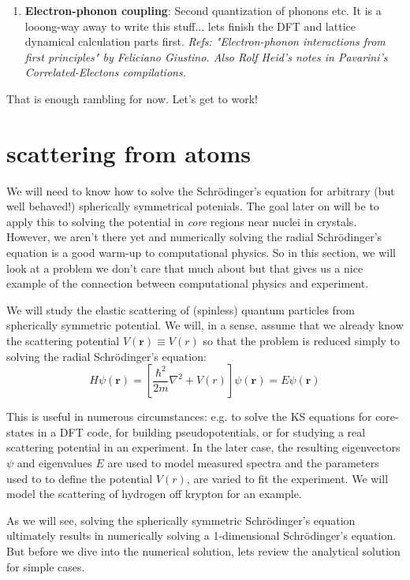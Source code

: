 \documentclass[prb,aps,11pt,superscriptaddress,floatfix]{revtex4-2}
\begin{document}
\begin{enumerate}
  \item \textbf{Electron-phonon coupling}: Second quantization of phonons etc. It is a looong-way away to write this stuff... lets finish the DFT and lattice dynamical calculation parts first. \emph{Refs: "Electron-phonon interactions from first principles" by Feliciano Giustino. Also Rolf Heid's notes in Pavarini's Correlated-Electons compilations.}
\end{enumerate}

That is enough rambling for now. Let's get to work!







\section{scattering from atoms}

We will need to know how to solve the Schr\"odinger's equation for arbitrary (but well behaved!) spherically symmetrical potenials. The goal later on will be to apply this to solving the potential in \emph{core} regions near nuclei in crystals. However, we aren't there yet and numerically solving the radial Schr\"odinger's equation is a good warm-up to computational physics. So in this section, we will look at a problem we don't care that much about but that gives us a nice example of the connection between computational physics and experiment.

We will study the elastic scattering of (spinless) quantum particles from spherically symmetric potential. We will, in a sense, assume that we already know the scattering potential $V(\pmb{r}) \equiv V(r)$ so that the problem is reduced simply to solving the radial Schr\"odinger's equation:
\begin{equation}
  H\psi(\pmb{r})= \left[ \frac{\hbar^2}{2m} \nabla^2 + V(r)\right]\psi(\pmb{r}) = E \psi(\pmb{r})
\end{equation}

This is useful in numerous circumstances: e.g. to solve the KS equations for core-states in a DFT code, for building pseudopotentials, or for studying a real scattering potential in an experiment. In the later case, the resulting eigenvectors $\psi$ and eigenvalues $E$ are used to model measured spectra and the parameters used to to define the potential $V(r)$, are varied to fit the experiment. We will model the scattering of hydrogen off krypton for an example. 

As we will see, solving the spherically symmetric Schr\"odinger's equation ultimately results in numerically solving a 1-dimensional Schr\"odinger's equation. But before we dive into the numerical solution, lets review the analytical solution for simple cases.
\end{document}
